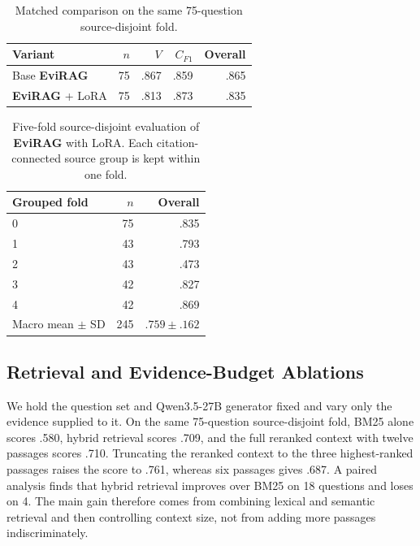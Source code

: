 \documentclass[11pt]{article}
\newcommand{\method}{\textbf{EviRAG}}
\begin{document}
\begin{table}[t]
\centering
\scriptsize
\begin{tabular}{lrrrr}
\toprule
Variant & $n$ & $V$ & $C_{F1}$ & Overall \\
\midrule
Base \method{} & 75 & .867 & .859 & .865 \\
\method{} + LoRA & 75 & .813 & .873 & .835 \\
\bottomrule
\end{tabular}
\caption{Matched comparison on the same 75-question source-disjoint fold.}
\label{tab:source-disjoint}
\end{table}

\begin{table}[t]
\centering
\small
\begin{tabular}{lrr}
\toprule
Grouped fold & $n$ & Overall \\
\midrule
0 & 75 & .835 \\
1 & 43 & .793 \\
2 & 43 & .473 \\
3 & 42 & .827 \\
4 & 42 & .869 \\
\midrule
Macro mean $\pm$ SD & 245 & $\mathbf{.759\pm.162}$ \\
\bottomrule
\end{tabular}
\caption{Five-fold source-disjoint evaluation of \method{} with LoRA. Each citation-connected source group is kept within one fold.}
\label{tab:grouped-cv}
\end{table}

\subsection{Retrieval and Evidence-Budget Ablations}
We hold the question set and Qwen3.5-27B generator fixed and vary only the evidence supplied to it. On the same 75-question source-disjoint fold, BM25 alone scores .580, hybrid retrieval scores .709, and the full reranked context with twelve passages scores .710. Truncating the reranked context to the three highest-ranked passages raises the score to .761, whereas six passages gives .687. A paired analysis finds that hybrid retrieval improves over BM25 on 18 questions and loses on 4. The main gain therefore comes from combining lexical and semantic retrieval and then controlling context size, not from adding more passages indiscriminately.
\end{document}
